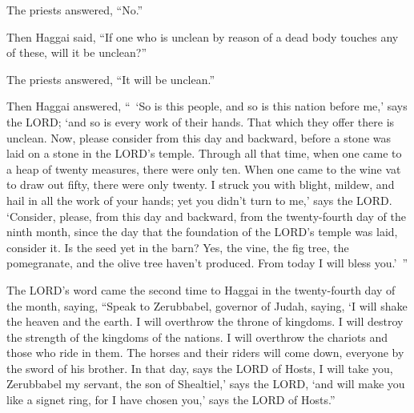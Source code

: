 The priests answered, “No.”


\myverse{}Then Haggai said, “If one who is unclean by reason of a dead
body touches any of these, will it be unclean?”

The priests answered, “It will be unclean.”


\myverse{}Then Haggai answered, “ ‘So is this people, and so is this nation
before me,’ says the LORD; ‘and so is every work of their hands. That which they offer there is unclean. \myverse{}Now, please consider from this day and backward, before a stone was laid on a stone in the LORD’s temple. \myverse{}Through all that time, when one came to a heap of twenty measures, there were only ten. When one came to the wine vat to draw out fifty, there were only twenty. \myverse{}I struck you with blight, mildew, and hail in all the work of your hands; yet you didn’t turn to me,’ says the LORD. \myverse{}‘Consider, please, from this day and backward, from the twenty-fourth day of the ninth month, since the day that the foundation of the LORD’s temple was laid, consider it. \myverse{}Is the seed yet in the barn? Yes, the vine, the fig tree, the pomegranate, and the olive tree haven’t produced. From today I will bless you.’ ”

 \myverse{}The LORD’s word came the second time to Haggai in the twenty-fourth day of the month, saying, \myverse{}“Speak to Zerubbabel, governor of Judah, saying, ‘I will shake the heaven and the earth. \myverse{}I will overthrow the throne of kingdoms. I will destroy the strength of the kingdoms of the nations. I will overthrow the chariots and those who ride in them. The horses and their riders will come down, everyone by the sword of his brother. \myverse{}In that day, says the LORD of Hosts, I will take you, Zerubbabel my servant, the son of Shealtiel,’ says the LORD, ‘and will make you like a signet ring, for I have chosen you,’ says the LORD of Hosts.”


